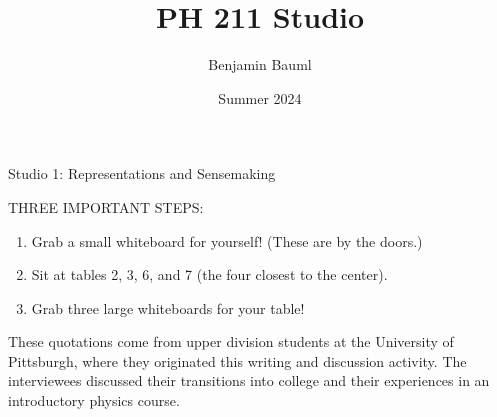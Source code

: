 \documentclass[]{article}
\title{PH 211 Studio \Week}
\author{Benjamin Bauml}
\date{Summer 2024}
\begin{document}
\begin{PresentSpace}
\begin{center}
	\huge Studio 1: Representations and Sensemaking
\end{center}
\vspace{1cm}
THREE IMPORTANT STEPS:
\begin{enumerate}
	\item Grab a small whiteboard for yourself! (These are by the doors.)
	\item Sit at tables 2, 3, 6, and 7 (the four closest to the center).
	\item Grab three large whiteboards for your table!
\end{enumerate}
\end{PresentSpace}
\newpage
\begin{TeacherMargin}
\VolReps
\VolRepsA
\VolRepsASol
\VolRepsB
\VolRepsBSol
\VolRepsC
\vspace{-10pt}
\VolRepsCSol
\vspace{-10pt}
\VolRepsD
\VolRepsDSol
\end{TeacherMargin}
\begin{PresentSpace}
\addtocounter{ActNumber}{-1}
\VolReps
\VolRepsA
\VolRepsB
\VolRepsC
\VolRepsD
\end{PresentSpace}
\newpage
\begin{TeacherMargin}
These quotations come from upper division students at the University of Pittsburgh, where they originated this writing and discussion activity. The interviewees discussed their transitions into college and their experiences in an introductory physics course.
\end{TeacherMargin}
\end{document}
